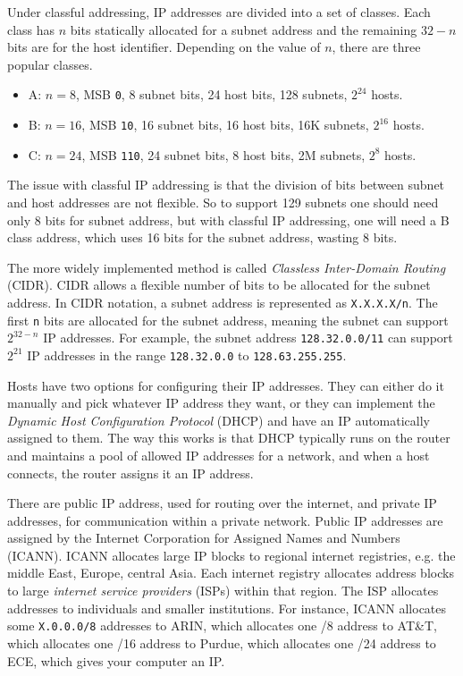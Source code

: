Under classful addressing, IP addresses
are divided into a set of classes.
Each class has $n$ bits statically
allocated for a subnet address and the
remaining $32-n$ bits are for the
host identifier. Depending on the
value of $n$, there are three
popular classes.
\begin{itemize}
    \item A: $n=8$, MSB \texttt{0}, 8 subnet bits, 24 host bits, 128 subnets, $2^24$ hosts.
    \item B: $n=16$, MSB \texttt{10}, 16 subnet bits, 16 host bits, 16K subnets, $2^16$ hosts.
    \item C: $n=24$, MSB \texttt{110}, 24 subnet bits, 8 host bits, 2M subnets, $2^8$ hosts.
\end{itemize}
The issue with classful IP addressing is that the division of bits between subnet
and host addresses are not flexible. So to support 129 subnets one should need
only 8 bits for subnet address, but with classful IP addressing, one will need a B
class address, which uses 16 bits for the subnet address, wasting 8 bits.

The more widely implemented method is called \emph{Classless Inter-Domain Routing}
(CIDR). CIDR allows a flexible number of bits to be allocated for the subnet
address. In CIDR notation, a subnet address is represented as \texttt{X.X.X.X/n}.
The first \texttt{n} bits are allocated for the subnet address, meaning the subnet can
support $2^{32-n}$ IP addresses. For example, the subnet address \texttt{128.32.0.0/11}
can support $2^21$ IP addresses in the range \texttt{128.32.0.0} to \texttt{128.63.255.255}.

Hosts have two options for configuring their IP addresses. They can either do it manually
and pick whatever IP address they want, or they can implement the \emph{Dynamic Host
    Configuration Protocol} (DHCP) and have an IP automatically assigned to them. The way
this works is that DHCP typically runs on the router and maintains a pool of allowed
IP addresses for a network, and when a host connects, the router assigns it an IP
address.

There are public IP address, used for routing over the internet, and private IP
addresses, for communication within a private network. Public IP addresses are
assigned by the Internet Corporation for Assigned Names and Numbers (ICANN).
ICANN allocates large IP blocks to regional internet registries, e.g. the middle East,
Europe, central Asia. Each internet registry allocates address blocks to large \emph{internet
    service providers} (ISPs) within that region. The ISP allocates addresses to individuals
and smaller institutions. For instance, ICANN allocates some \texttt{X.0.0.0/8} addresses
to ARIN, which allocates one /8 address to AT\&T, which allocates
one /16 address to Purdue, which allocates one /24 address to ECE, which gives your
computer an IP.


